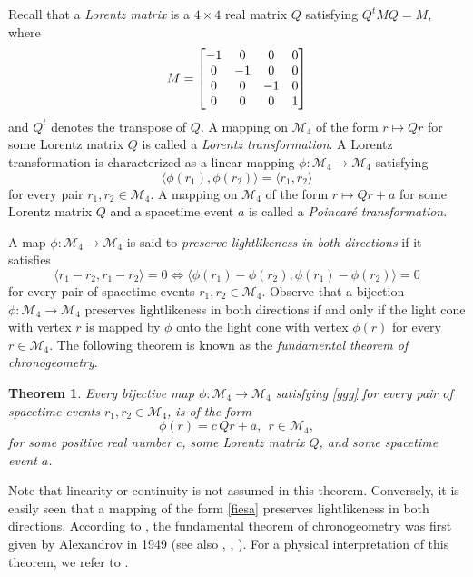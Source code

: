 \documentclass[10pt]{amsart}
\newtheorem{theorem}{Theorem}[section]
\theoremstyle{definition}
\theoremstyle{remark}
\numberwithin{subsection}{section}
\numberwithin{equation}{section}
\newcommand\cM{{\mathcal{M}}}
\begin{document}
Recall that a \emph{Lorentz matrix} is a $4\times 4$ real matrix $Q$ satisfying $Q^t MQ = M$, where
\begin{equation}\label{Matrix}
M = \left[ \begin{matrix} -1 & 0 & 0 & 0 \cr
0 & -1 & 0 & 0 \cr
0 & 0 & -1 & 0 \cr
0 & 0 & 0 & 1 \cr\end{matrix} \right] \index{$M$}
\end{equation}
and $Q^t$ denotes the transpose of $Q$.
A mapping on $\cM_4$ of the form $r\mapsto Qr$ for some Lorentz matrix $Q$ is called a \emph{Lorentz transformation}.  
A Lorentz transformation is characterized as a linear mapping $\phi\colon \cM_4\to \cM_4$ satisfying 
\[
\langle \phi(r_1), \phi(r_2) \rangle = \langle r_1 , r_2 \rangle
\] 
for every pair $r_1,r_2\in \cM_4$.
A mapping on $\cM_4$ of the form $r\mapsto Qr+a$ for some Lorentz matrix $Q$ and a spacetime event $a$ is called a \emph{Poincar\'e transformation}.

A map $\phi \colon \mathcal{M}_4 \to \mathcal{M}_4$ is said to \emph{preserve lightlikeness in both directions}  if it satisfies
\begin{equation}\label{ggg}
\langle r_1 - r_2 , r_1 - r_2 \rangle = 0 \iff \langle \phi (r_1 ) - \phi ( r_2 ) , \phi ( r_1 ) - \phi ( r_2 ) \rangle = 0
\end{equation}
for every pair of spacetime events $r_1, r_2 \in \mathcal{M}_4$.
Observe that a bijection $\phi \colon \mathcal{M}_4 \to \mathcal{M}_4$ preserves lightlikeness in both directions if and only if the light cone with vertex $r$ is mapped by $\phi$ onto the light cone with vertex $\phi(r)$ for every $r\in \cM_4$.
The following theorem is known as the \emph{fundamental theorem of chronogeometry}.
\begin{theorem}\label{ftc}
Every bijective map $\phi \colon \mathcal{M}_4 \to \mathcal{M}_4$ satisfying \eqref{ggg} for every pair of spacetime events $r_1, r_2 \in \mathcal{M}_4$, is of the form
\begin{equation}\label{fiesa}
\phi (r) =   c\,Qr + a,\ \ r\in \cM_4,
\end{equation}
for some positive real number $c$, some Lorentz matrix $Q$, and some spacetime event $a$.
\end{theorem}
Note that linearity or continuity is not assumed in this theorem.
Conversely, it is easily seen that a mapping of the form \eqref{fiesa} preserves lightlikeness in both directions.
According to \cite{Al3}, the fundamental theorem of chronogeometry was first given by Alexandrov in 1949 \cite{Al1} (see also \cite{Al2}, \cite{Ben}, \cite{Zee}).
For a physical interpretation of this theorem, we refer to \cite[p.691]{Pfe}. 
\end{document}
